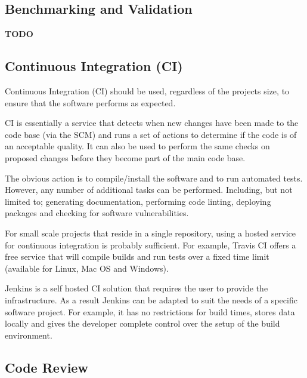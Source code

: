 \documentclass[jnr]{iosart2x}
\newcommand{\todo}[1]{\textbf{#1}}
\begin{document}
\subsection{Benchmarking and Validation}
\label{Benchmarking and Validation}

\todo{TODO}

\subsection{Continuous Integration (CI)}
\label{Continuous integration}

Continuous Integration (CI) should be used, regardless of the projects size, to ensure that the software performs as expected.

CI is essentially a service that detects when new changes have been made to the code base (via the SCM) and runs a set of actions to determine if the code is of an acceptable quality.
It can also be used to perform the same checks on proposed changes before they become part of the main code base.

The obvious action is to compile/install the software and to run automated tests.
However, any number of additional tasks can be performed.
Including, but not limited to; generating documentation, performing code linting, deploying packages and checking for software vulnerabilities.

For small scale projects that reside in a single repository, using a hosted service for continuous integration is probably sufficient.
For example, Travis CI \cite{Travis_CI} offers a free service that will compile builds and run tests over a fixed time limit (available for Linux, Mac OS and Windows).

Jenkins \cite{Jenkins} is a self hosted CI solution that requires the user to provide the infrastructure.
As a result Jenkins can be adapted to suit the needs of a specific software project.
For example, it has no restrictions for build times, stores data locally and gives the developer complete control over the setup of the build environment.

\subsection{Code Review}
\label{Code review}
\end{document}
